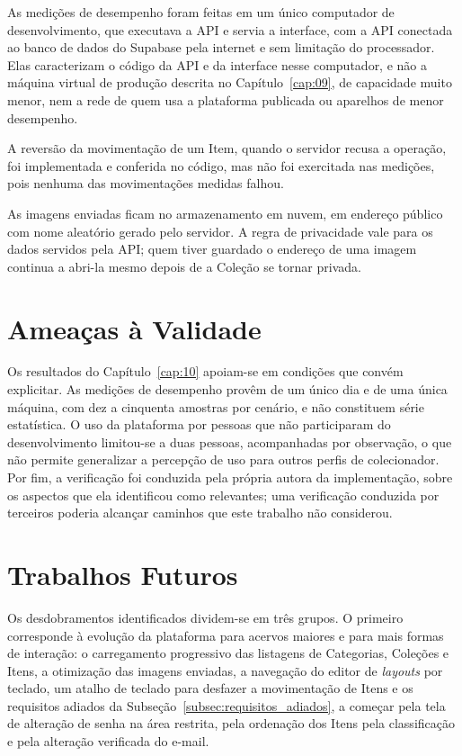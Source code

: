 As medições de desempenho foram feitas em um único computador de desenvolvimento, que executava a API e servia a interface, com a API conectada ao banco de dados do Supabase pela internet e sem limitação do processador. Elas caracterizam o código da API e da interface nesse computador, e não a máquina virtual de produção descrita no Capítulo~\ref{cap:09}, de capacidade muito menor, nem a rede de quem usa a plataforma publicada ou aparelhos de menor desempenho.

A reversão da movimentação de um Item, quando o servidor recusa a operação, foi implementada e conferida no código, mas não foi exercitada nas medições, pois nenhuma das movimentações medidas falhou.

As imagens enviadas ficam no armazenamento em nuvem, em endereço público com nome aleatório gerado pelo servidor. A regra de privacidade vale para os dados servidos pela API; quem tiver guardado o endereço de uma imagem continua a abri-la mesmo depois de a Coleção se tornar privada.

\section{Ameaças à Validade}

Os resultados do Capítulo~\ref{cap:10} apoiam-se em condições que convém explicitar. As medições de desempenho provêm de um único dia e de uma única máquina, com dez a cinquenta amostras por cenário, e não constituem série estatística. O uso da plataforma por pessoas que não participaram do desenvolvimento limitou-se a duas pessoas, acompanhadas por observação, o que não permite generalizar a percepção de uso para outros perfis de colecionador. Por fim, a verificação foi conduzida pela própria autora da implementação, sobre os aspectos que ela identificou como relevantes; uma verificação conduzida por terceiros poderia alcançar caminhos que este trabalho não considerou.

\section{Trabalhos Futuros}

Os desdobramentos identificados dividem-se em três grupos. O primeiro corresponde à evolução da plataforma para acervos maiores e para mais formas de interação: o carregamento progressivo das listagens de Categorias, Coleções e Itens, a otimização das imagens enviadas, a navegação do editor de \textit{layouts} por teclado, um atalho de teclado para desfazer a movimentação de Itens e os requisitos adiados da Subseção~\ref{subsec:requisitos_adiados}, a começar pela tela de alteração de senha na área restrita, pela ordenação dos Itens pela classificação e pela alteração verificada do e-mail.

